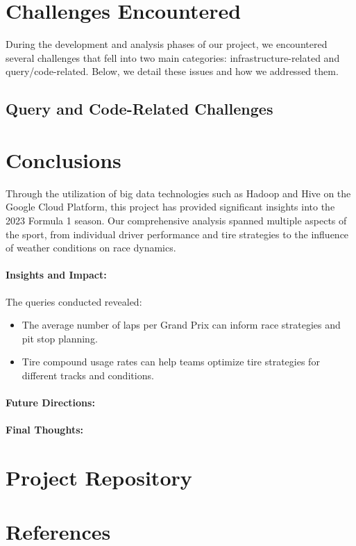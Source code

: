 \documentclass{article}
\begin{document}
\section{Challenges Encountered}
During the development and analysis phases of our project, we encountered several challenges that fell into two main categories: infrastructure-related and query/code-related. Below, we detail these issues and how we addressed them.

\subsection{Query and Code-Related Challenges}


\section{Conclusions}
Through the utilization of big data technologies such as Hadoop and Hive on the Google Cloud Platform, this project has provided significant insights into the 2023 Formula 1 season. Our comprehensive analysis spanned multiple aspects of the sport, from individual driver performance and tire strategies to the influence of weather conditions on race dynamics.

\paragraph{Insights and Impact:}
The queries conducted revealed:
\begin{itemize}
    \item The average number of laps per Grand Prix can inform race strategies and pit stop planning.
    \item Tire compound usage rates can help teams optimize tire strategies for different tracks and conditions.
    
\end{itemize}


\paragraph{Future Directions:}


\paragraph{Final Thoughts:}




\section{Project Repository}


\section{References}
\label{sec:references}
\end{document}
